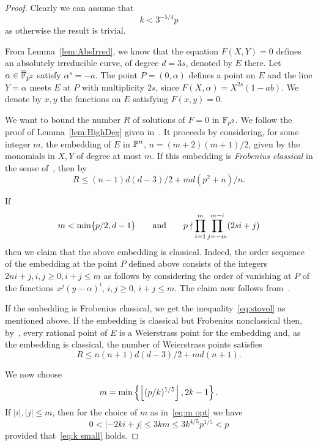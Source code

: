 \documentclass[12pt]{amsart}
\begin{document}
\begin{proof}  Clearly we can assume that 
\begin{equation}
\label{eq:k small}
k < 3^{-5/4} p
\end{equation}
as otherwise the result is trivial. 

From Lemma~\ref{lem:AbsIrred}, we know that the equation $F(X,Y)=0$ defines an absolutely irreducible curve, of
degree $d=3s$,
denoted by $E$ there. Let $\alpha \in \overline {{\mathbb F}}_{p^2}$ satisfy $\alpha^s = -a$. The point $P=(0,\alpha)$
defines a point on $E$ and the line $Y=\alpha$ meets $E$ at $P$ with multiplicity $2s$, since 
$F(X,\alpha) = X^{2s}(1-ab)$. We denote by $x,y$ the functions on $E$ satisfying $F(x,y)=0$.

We want to bound the number $R$ of solutions of $F=0$ in ${\mathbb F}_{p^2}$. We follow the proof of
Lemma~\ref{lem:HighDeg} given  in~\cite[Theorem~(i)]{Vol}. It proceeds by considering, for some
integer $m$, the embedding
of $E$ in ${\mathbb P}^n$, $n = (m+2)(m+1)/2$, given by the monomials in $X,Y$ of degree at most $m$.
If this embedding is {\it Frobenius classical\/} in the sense of~\cite{StoVol}, then 
by~\cite[Theorem~2.13]{StoVol}
\begin{equation}
\label{eq:stovol}
R \le (n-1)d(d-3)/2 + md(p^2+n)/n.
\end{equation}

If 
\begin{equation}
\label{eq:cond}
m < \min\{ p/2, d-1\} \qquad\mbox{and}\qquad 
p \nmid \prod_{i=1}^m \prod_{j=-m}^{m-i} (2si + j)
\end{equation}
then we claim that
the above embedding is classical. Indeed, the order sequence of the embedding at the point $P$ defined above
consists of the integers $2ni+j, i,j \ge 0, i+j \le m$ as follows by considering the order of vanishing at $P$ of the
functions $x^j(y-\alpha)^i$,  $i,j \ge 0$, $i+j \le m$. The claim now follows 
from~\cite[Corollary~1.7]{StoVol}. 

If the embedding is Frobenius classical, we get the inequality~\eqref{eq:stovol} as mentioned above. If the embedding is
classical but Frobenius nonclassical then, by~\cite[Corollary~2.16]{StoVol}, every rational point of $E$ is a 
Weierstrass point for the embedding and, as the embedding is classical, the number of Weierstrass points satisfies 
\begin{equation}
\label{eq:wp}
R \le n(n+1)d(d-3)/2 + md(n+1). 
\end{equation}

We now choose 
\begin{equation}
\label{eq:m opt}
m = \min\left\{\left\lfloor(p/k)^{1/5}\right\rfloor, 2k-1\right\}.
\end{equation}
If $|i|,|j| \le m$, then for the choice of $m$ as in~\eqref{eq:m opt} we have
\begin{equation}
\label{eq:main ineq}
0 < |-2ki + j| \le 3km \le  3 k^{4/5}p^{1/5} < p
\end{equation}
provided that~\eqref{eq:k small} holds.



\end{proof}
\end{document}
